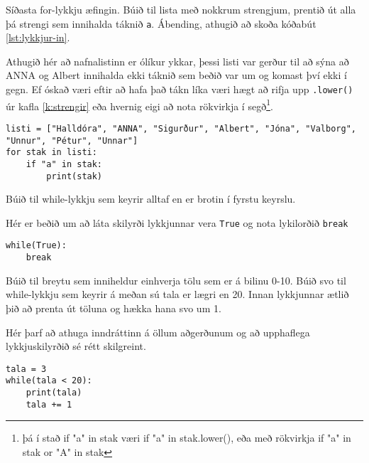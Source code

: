 \begin{exercise}\label{lyk5}
Síðasta for-lykkju æfingin.
Búið til lista með nokkrum strengjum, prentið út alla þá strengi sem innihalda táknið \texttt{a}.
Ábending, athugið að skoða kóðabút \ref{lst:lykkjur-in}.
\end{exercise}
\begin{Answer}[ref={lyk5}]
Athugið hér að nafnalistinn er ólíkur ykkar, þessi listi var gerður til að sýna að ANNA og Albert innihalda ekki táknið sem beðið var um og komast því ekki í gegn.
Ef óskað væri eftir að hafa það tákn líka væri hægt að rifja upp \texttt{.lower()} úr kafla \ref{k:strengir} eða hvernig eigi að nota rökvirkja í segð\footnote{þá í stað if "a" in stak væri if "a" in stak.lower(), eða með rökvirkja if "a" in stak or "A" in stak}.
	
\begin{lstlisting}
listi = ["Halldóra", "ANNA", "Sigurður", "Albert", "Jóna", "Valborg", "Unnur", "Pétur", "Unnar"]
for stak in listi:
	if "a" in stak:
		print(stak)\end{lstlisting}
\end{Answer}

\begin{exercise}\label{lyk6}
Búið til while-lykkju sem keyrir alltaf en er brotin í fyrstu keyrslu.
\end{exercise}
\begin{Answer}[ref={lyk6}]
Hér er beðið um að láta skilyrði lykkjunnar vera \texttt{True} og nota lykilorðið \texttt{break}
	
\begin{lstlisting}
while(True):
	break\end{lstlisting}
\end{Answer}

\begin{exercise}\label{lyk7}
Búið til breytu sem inniheldur einhverja tölu sem er á bilinu 0-10.
Búið svo til while-lykkju sem keyrir á meðan sú tala er lægri en 20.
Innan lykkjunnar ætlið þið að prenta út töluna og hækka hana svo um 1.
\end{exercise}
\begin{Answer}[ref={lyk7}]
Hér þarf að athuga inndráttinn á öllum aðgerðunum og að upphaflega lykkjuskilyrðið sé rétt skilgreint.
\begin{lstlisting}
tala = 3
while(tala < 20):
	print(tala)
	tala += 1\end{lstlisting}
\end{Answer}


